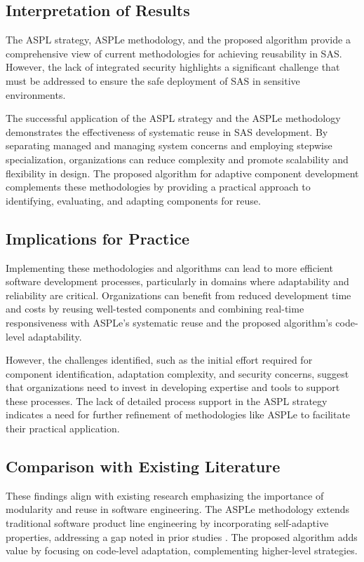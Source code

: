 \documentclass[a4paper,10pt]{article}
\begin{document}
\subsection{Interpretation of Results}

The ASPL strategy, ASPLe methodology, and the proposed algorithm provide a comprehensive view of current methodologies for achieving reusability in SAS. However, the lack of integrated security highlights a significant challenge that must be addressed to ensure the safe deployment of SAS in sensitive environments.

The successful application of the ASPL strategy and the ASPLe methodology demonstrates the effectiveness of systematic reuse in SAS development. By separating managed and managing system concerns and employing stepwise specialization, organizations can reduce complexity and promote scalability and flexibility in design. The proposed algorithm for adaptive component development complements these methodologies by providing a practical approach to identifying, evaluating, and adapting components for reuse.

\subsection{Implications for Practice}

Implementing these methodologies and algorithms can lead to more efficient software development processes, particularly in domains where adaptability and reliability are critical. Organizations can benefit from reduced development time and costs by reusing well-tested components and combining real-time responsiveness with ASPLe’s systematic reuse and the proposed algorithm’s code-level adaptability.

However, the challenges identified, such as the initial effort required for component identification, adaptation complexity, and security concerns, suggest that organizations need to invest in developing expertise and tools to support these processes. The lack of detailed process support in the ASPL strategy indicates a need for further refinement of methodologies like ASPLe to facilitate their practical application.

\subsection{Comparison with Existing Literature}

These findings align with existing research emphasizing the importance of modularity and reuse in software engineering. The ASPLe methodology extends traditional software product line engineering by incorporating self-adaptive properties, addressing a gap noted in prior studies \cite{Nadeem2020}. The proposed algorithm adds value by focusing on code-level adaptation, complementing higher-level strategies.
\end{document}
